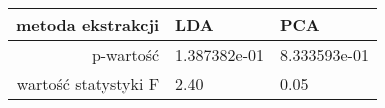 \begin{tabular}{|r|l|l|}
  \hline
  metoda ekstrakcji & LDA & PCA \\
  \hline
  p-wartość & 1.387382e-01 & 8.333593e-01 \\
  \hline
  wartość statystyki F & 2.40 & 0.05 \\
  \hline
\end{tabular}
